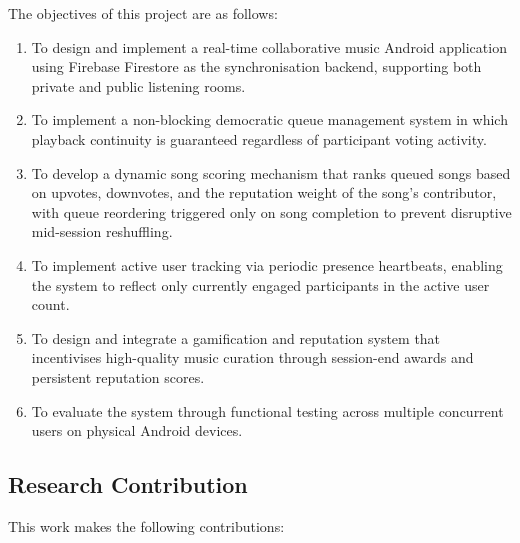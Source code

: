 \documentclass[pdflatex,sn-mathphys-num,iicol]{sn-jnl}
\theoremstyle{thmstyleone}%
\theoremstyle{thmstyletwo}%
\theoremstyle{thmstylethree}%
\begin{document}
The objectives of this project are as follows:

\begin{enumerate}
    \item To design and implement a real-time collaborative music Android application
    using Firebase Firestore as the synchronisation backend, supporting both private and
    public listening rooms.

    \item To implement a non-blocking democratic queue management system in which
    playback continuity is guaranteed regardless of participant voting activity.

    \item To develop a dynamic song scoring mechanism that ranks queued songs based on
    upvotes, downvotes, and the reputation weight of the song's contributor, with queue
    reordering triggered only on song completion to prevent disruptive mid-session
    reshuffling.

    \item To implement active user tracking via periodic presence heartbeats, enabling
    the system to reflect only currently engaged participants in the active user count.

    \item To design and integrate a gamification and reputation system that incentivises
    high-quality music curation through session-end awards and persistent reputation
    scores.

    \item To evaluate the system through functional testing across multiple concurrent
    users on physical Android devices.
\end{enumerate}

\subsection{Research Contribution}

This work makes the following contributions:
\end{document}
